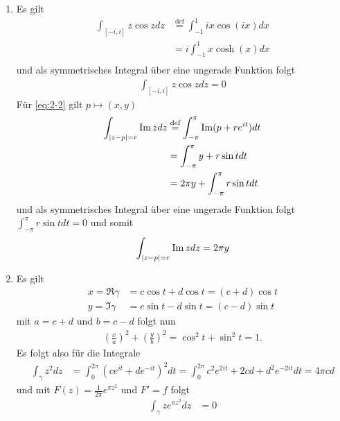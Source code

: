 \documentclass[ngerman]{report}
\begin{document}
\begin{answer}\hspace{\linewidth}
    \begin{enumerate}
        \item Es gilt 
        \begin{align*}
            \int_{[-i,i]} z\cos z dz &\overset{\text{def}}{=} \int_{-1}^1 ix\cos(ix)dx\\
            &= i\int_{-1}^1 x \cosh(x)dx\\
        \end{align*}
        und als symmetrisches Integral über eine ungerade Funktion folgt 
        \begin{align*}
            \int_{[-i,i]} z\cos z dz = 0
        \end{align*}
        Für \cref{eq:2-2} gilt $p \mapsto (x,y)$
        \begin{align*}
            \int_{\left|z-p\right|=r} \Im z dz &\overset{\text{def}}{=} \int_{-\pi}^{\pi} \Im(p+re^{it}) dt\\
            &= \int_{-\pi}^{\pi} y+r\sin t dt\\
            &= 2\pi y + \int_{-\pi}^{\pi} r\sin t dt
        \end{align*}
        und als symmetrisches Integral über eine ungerade Funktion folgt $\int_{-\pi}^{\pi} r\sin t dt = 0$ und somit
        \begin{align*}
            \int_{\left|z-p\right|=r} \Im z dz = 2\pi y
        \end{align*}
        \item Es gilt 
        \begin{align*}
            x = \Re \gamma &= c\cos t+ d\cos t = (c+d)\cos t\\
            y = \Im \gamma &= c\sin t- d\sin t = (c-d) \sin t
        \end{align*}
        mit $a = c+d$ und $b = c-d$ folgt nun
        \begin{align*}
            \left(\frac{x}{a}\right)^2 + \left(\frac{y}{b}\right)^2 = \cos^2t+\sin^2t=1.
        \end{align*}
        Es folgt also für die Integrale
        \begin{align*}
            \int_\gamma z^2 dz &= \int_0^{2\pi} (ce^{it}+de^{-it})^2 dt = \int_0^{2\pi} c^2e^{2it}+2cd+ d^2e^{-2it} dt = 4\pi cd
        \end{align*}
        und mit $F(z) = \frac{1}{2\pi} e^{\pi z^2}$ und $F' = f$ folgt
        \begin{align*}
            \int_\gamma z e^{\pi z^2} dz &= 0
        \end{align*}
    \end{enumerate}
\end{answer}
\end{document}
